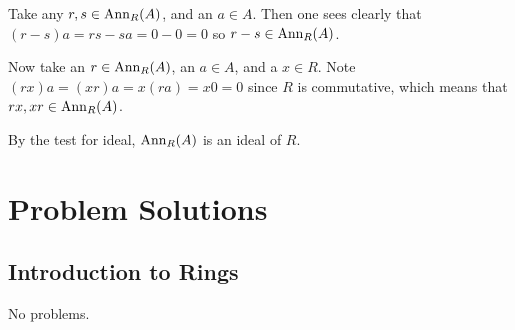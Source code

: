 \begin{enumerate}
    Take any $r, s \in \mathrm{Ann}_{R}(A)$, and an $a \in A$. Then one sees clearly that $(r-s)a = rs - sa = 0 - 0 = 0$ so $r-s \in \mathrm{Ann}_{R}(A)$.

    Now take an $r \in \mathrm{Ann}_{R}(A)$, an $a \in A$, and a $x \in R$. Note $(rx)a = (xr)a = x(ra) = x0 = 0$ since $R$ is commutative, which means that $rx, xr \in \mathrm{Ann}_{R}(A)$.

    By the test for ideal, $\mathrm{Ann}_{R}(A)$ is an ideal of $R$.
\end{enumerate}

\chapter{Problem Solutions}
\section{Introduction to Rings}
No problems.

